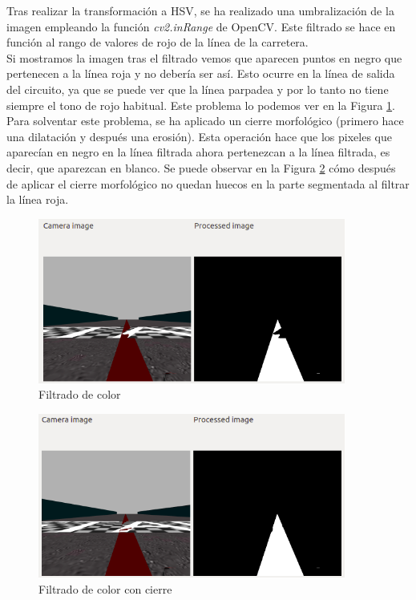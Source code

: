 Tras realizar la transformación a HSV, se ha realizado una umbralización de la imagen empleando la función \textit{cv2.inRange} de OpenCV. Este filtrado se hace en función al rango de valores de rojo de la línea de la carretera.\\

Si mostramos la imagen tras el filtrado vemos que aparecen puntos en negro que pertenecen a la línea roja y no debería ser así. Esto ocurre en la línea de salida del circuito, ya que se puede ver que la línea parpadea y por lo tanto no tiene siempre el tono de rojo habitual. Este problema lo podemos ver en la Figura \ref{fig.color}. Para solventar este problema, se ha aplicado un cierre morfológico (primero hace una dilatación y después una erosión). Esta operación hace que los pixeles que aparecían en negro en la línea filtrada ahora pertenezcan a la línea filtrada, es decir, que aparezcan en blanco. Se puede observar en la Figura \ref{fig.cierre} cómo después de aplicar el cierre morfológico no quedan huecos en la parte segmentada al filtrar la línea roja.\\

\begin{figure}
  \begin{center}
    \includegraphics[width=0.9\textwidth]{figures/Infraestructura/filtro_color.png}
		\caption{Filtrado de color}
		\label{fig.color}
		\end{center}
\end{figure}


\begin{figure}
  \begin{center}
    \includegraphics[width=0.9\textwidth]{figures/Infraestructura/filtro_cierre.png}
		\caption{Filtrado de color con cierre}
		\label{fig.cierre}
		\end{center}
\end{figure}

